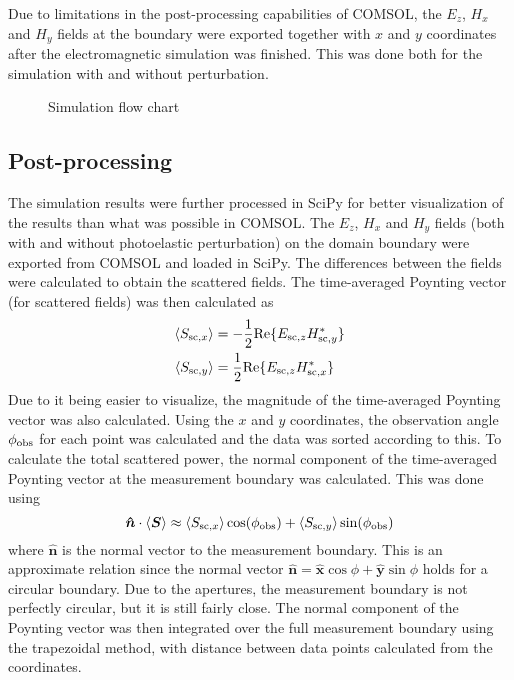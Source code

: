 \documentclass[11pt,twoside]{eitExjobb}
\begin{document}
	Due to limitations in the post-processing capabilities of COMSOL, the $E_z$, $H_x$ and $H_y$ fields at the boundary were exported together with $x$ and $y$ coordinates after the electromagnetic simulation was finished. This was done both for the simulation with and without perturbation.
	
	\begin{figure}[h]
		\centering
		\resizebox{\textwidth}{!}{
			
		}
		\caption{\label{fig:simulationflow} Simulation flow chart}
	\end{figure}
	
	\subsection{Post-processing}
	The simulation results were further processed in SciPy for better visualization of the results than what was possible in COMSOL. The $E_z$, $H_x$ and $H_y$ fields (both with and without photoelastic perturbation) on the domain boundary were exported from COMSOL and loaded in SciPy. The differences between the fields were calculated to obtain the scattered fields. The time-averaged Poynting vector (for scattered fields) was then calculated as
	\begin{align*}
		\left< S_{\mathrm{sc},x} \right> &= -\frac{1}{2} \text{Re} \{ E_{\mathrm{sc},z} H_{\mathrm{sc},y}^* \} \\
		\left< S_{\mathrm{sc},y} \right> &= \frac{1}{2} \text{Re} \{ E_{\mathrm{sc},z} H_{\mathrm{sc},x}^* \}
	\end{align*}
	Due to it being easier to visualize, the magnitude of the time-averaged Poynting vector was also calculated. Using the $x$ and $y$ coordinates, the observation angle $\phi_{\mathrm{obs}}$ for each point was calculated and the data was sorted according to this. To calculate the total scattered power, the normal component of the time-averaged Poynting vector at the measurement boundary was calculated. This was done using
	\begin{equation*}
		\bm{\hat{n}} \cdot \left< \bm{S} \right> \approx \left< S_{\mathrm{sc},x} \right> \cos(\phi_{\mathrm{obs}}) + \left< S_{\mathrm{sc},y} \right> \sin(\phi_{\mathrm{obs}})
	\end{equation*}
	where $\bm{\hat{n}}$ is the normal vector to the measurement boundary. This is an approximate relation since the normal vector $\bm{\hat{n}} = \bm{\hat{x}} \cos{\phi} + \bm{\hat{y}} \sin{\phi}$ holds for a circular boundary. Due to the apertures, the measurement boundary is not perfectly circular, but it is still fairly close. The normal component of the Poynting vector was then integrated over the full measurement boundary using the trapezoidal method, with distance between data points calculated from the coordinates.
	
\end{document}
